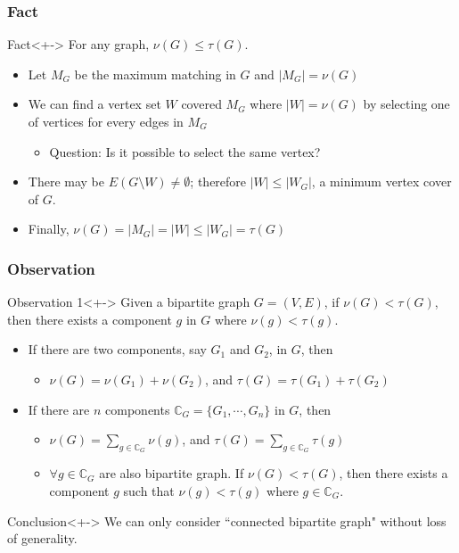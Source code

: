 \documentclass{beamer}
\begin{document}
\begin{frame}
  \frametitle{Fact}
  \begin{block}{Fact}<+->
    For any graph, $\nu{(G)}\leq{\tau{(G)}}$.
  \end{block}
  \begin{itemize}[<+->]
  \item Let $M_G$ be the maximum matching in $G$ and $|M_G|=\nu{(G)}$
  \item<+-> We can find a vertex set $W$ covered $M_G$ where $|W|=\nu{(G)}$ by selecting one of vertices for every edges in $M_G$
    \begin{itemize}
    \item Question: Is it possible to select the same vertex? 
    \end{itemize}
  \item<+-> There may be $E(G\setminus{W})\neq{\emptyset}$; therefore $|W|\leq{|W_G|}$, a minimum vertex cover of $G$.
  \item<+-> Finally, $\nu{(G)}=|M_G|=|W|\leq{|W_G|}=\tau{(G)}$
  \end{itemize}
\end{frame}

\begin{frame}
  \frametitle{Observation}
  \begin{exampleblock}{Observation 1}<+->
    Given a bipartite graph $G=(V,E)$, if $\nu{(G)}<\tau{(G)}$, then there exists a component $g$ in $G$ where $\nu{(g)}<\tau{(g)}$.
  \end{exampleblock}
  \begin{itemize}[<+->]
  \item If there are two components, say $G_1$ and $G_2$, in $G$, then
    \begin{itemize}
    \item $\nu{(G)}=\nu{(G_1)}+\nu{(G_2)}$, and $\tau{(G)}=\tau{(G_1)+\tau{(G_2)}}$
    \end{itemize}
  \item If there are $n$ components $\mathbb{C}_{G}=\{{G_1,\cdots,G_n}\}$ in $G$, then
    \begin{itemize}
    \item $\nu{(G)}=\sum_{g\in{\mathbb{C}_{G}}}{\nu{(g)}}$, and $\tau{(G)}=\sum_{g\in{\mathbb{C}_{G}}}{\tau{(g)}}$
    \item $\forall{g}\in{\mathbb{C}_{G}}$ are also \alert{bipartite graph}. If $\nu{(G)}<\tau{(G)}$, then there exists a component $g$ such that $\nu{(g)}<\tau{(g)}$ where $g\in{\mathbb{C}_{G}}$.
    \end{itemize}
  \end{itemize}
  \begin{alertblock}{Conclusion}<+->
  We can only consider ``connected bipartite graph" without loss of generality.
  \end{alertblock}
\end{frame}
\end{document}
